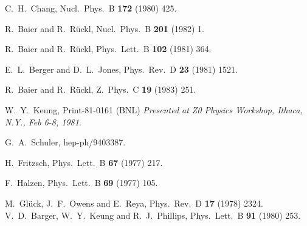 \begin{thebibliography}{999}
C.~H.~Chang,
Nucl.\ Phys.\ B {\bf 172} (1980) 425.

R.~Baier and R.~R\"uckl,
Nucl.\ Phys.\ B {\bf 201} (1982) 1.

R.~Baier and R.~R\"uckl,
Phys.\ Lett.\ B {\bf 102} (1981) 364.

E.~L.~Berger and D.~L.~Jones,
Phys.\ Rev.\ D {\bf 23} (1981) 1521.

R.~Baier and R.~R\"uckl,
Z.\ Phys.\ C {\bf 19} (1983) 251.

W.~Y.~Keung,
Print-81-0161 (BNL)
{\it Presented at Z0 Physics Workshop, Ithaca, N.Y., Feb 6-8, 1981}.

G.~A.~Schuler,
hep-ph/9403387.


H.~Fritzsch,
Phys.\ Lett.\ B {\bf 67} (1977) 217.

F.~Halzen,
Phys.\ Lett.\ B {\bf 69} (1977) 105.

M.~Gl\"uck, J.~F.~Owens and E.~Reya,
Phys.\ Rev.\ D {\bf 17} (1978) 2324.
V.~D.~Barger, W.~Y.~Keung and R.~J.~Phillips,
Phys.\ Lett.\ B {\bf 91} (1980) 253.


\end{thebibliography}
